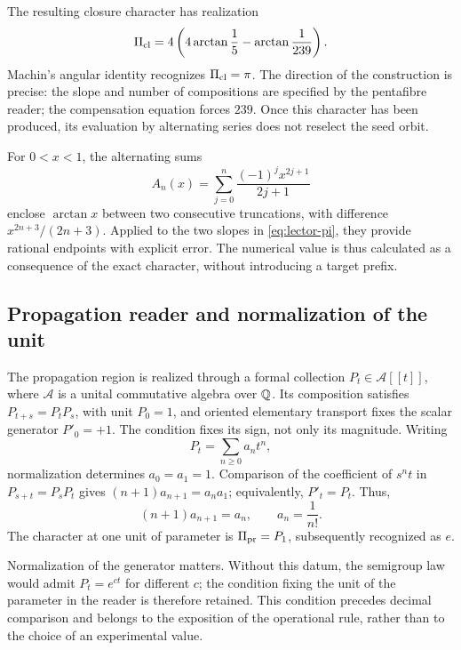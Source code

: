 The resulting closure character has realization
\begin{equation}
 \Pi_{\rm cl}=4\left(4\arctan\frac15-\arctan\frac1{239}\right).
 \label{eq:lector-pi}
\end{equation}
Machin's angular identity recognizes \(\Pi_{\rm cl}=\pi\). The direction of the construction is precise: the slope and number of compositions are specified by the pentafibre reader; the compensation equation forces \(239\). Once this character has been produced, its evaluation by alternating series does not reselect the seed orbit.

For \(0<x<1\), the alternating sums
\[
 A_n(x)=\sum_{j=0}^n\frac{(-1)^jx^{2j+1}}{2j+1}
\]
enclose \(\arctan x\) between two consecutive truncations, with difference \(x^{2n+3}/(2n+3)\). Applied to the two slopes in \eqref{eq:lector-pi}, they provide rational endpoints with explicit error. The numerical value is thus calculated as a consequence of the exact character, without introducing a target prefix.

\subsection{Propagation reader and normalization of the unit}

The propagation region is realized through a formal collection \(P_t\in\mathcal A[[t]]\), where \(\mathcal A\) is a unital commutative algebra over \(\mathbb Q\). Its composition satisfies \(P_{t+s}=P_tP_s\), with unit \(P_0=1\), and oriented elementary transport fixes the scalar generator \(P'_0=+1\). The condition fixes its sign, not only its magnitude. Writing
\[
 P_t=\sum_{n\ge0}a_nt^n,
\]
normalization determines \(a_0=a_1=1\). Comparison of the coefficient of \(s^nt\) in \(P_{s+t}=P_sP_t\) gives \((n+1)a_{n+1}=a_na_1\); equivalently, \(P'_t=P_t\). Thus,
\begin{equation}
 (n+1)a_{n+1}=a_n,\qquad a_n=\frac1{n!}.
 \label{eq:propagacion}
\end{equation}
The character at one unit of parameter is \(\Pi_{\rm pr}=P_1\), subsequently recognized as \(e\).

Normalization of the generator matters. Without this datum, the semigroup law would admit \(P_t=e^{ct}\) for different \(c\); the condition fixing the unit of the parameter in the reader is therefore retained. This condition precedes decimal comparison and belongs to the exposition of the operational rule, rather than to the choice of an experimental value.

